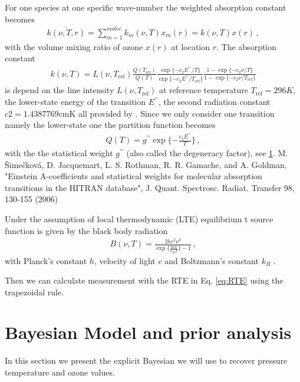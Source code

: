 For one species at one specific wave-number the weighted absorption constant becomes
\begin{align}
	\overline{k(\nu, T, r)}    = \sum_{m=1}^{molec} k_m(\nu, T) x_m(r) =  k(\nu, T) x(r) \, ,
\end{align}
with the volume mixing ratio of ozone $x(r)$ at location $r$. 
The absorption constant
\begin{align}
	k(\nu, T) = L(\nu, T_{\text{ref}}) \frac{Q(T_{\text{ref}})}{Q(T)} \frac{ \exp{\{ - c_2 E^{\prime \prime} / T\}} }{\exp{\{ - c_2 E^{\prime \prime} / T_{\text{ref}} \}}} \frac{ 1- \exp{\{ - c_2 \nu  / T \}} }{1 - \exp{\{ - c_2 \nu / T_{\text{ref}} \}}}
\end{align}
is depend on the line intensity $L(\nu, T_{\text{ref}})$ at reference temperature $T_{\text{ref}} =296K $, the lower-state energy of the transition $ E^{\prime \prime} $, the second radiation constant $c2=1.4387769\text{cmK}$ all provided by \cite{}.
Since we only consider one transition namely the lower-state one the partition function becomes
\begin{align}
	Q(T )= g^{\prime \prime} \exp{\{ - \frac{ c_2 E^{\prime \prime} }{T}\}} \, ,
\end{align}
with the the statistical weight $ g^{\prime \prime}$ (also called the degeneracy factor), see \ref{}.
M. Šimečková, D. Jacquemart, L. S. Rothman, R. R. Gamache, and A. Goldman, "Einstein A-coefficients and statistical weights for molecular absorption transitions in the HITRAN database", J. Quant. Spectrosc. Radiat. Transfer 98, 130-155 (2006)

Under the assumption of local thermodynamic (LTE) equilibrium t source function is given by the black body radiation
\begin{align}
	B(\nu,T)   = \frac{2 h c^2 \nu^3}{\exp{\{\frac{hc\nu}{k_B T}\}}-1}\, ,
\end{align}
with Planck's constant $h$, velocity of light $c$ and Boltzmann's constant $k_B$ \cite{}.

Then we can calculate measurement with the RTE in Eq. \ref{eq:RTE} using the trapezoidal rule.



\section{Bayesian Model and prior analysis}
In this section we present the explicit Bayesian we will use to recover pressure temperature and ozone values.

